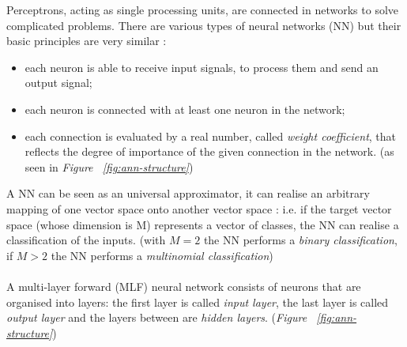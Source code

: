 \documentclass[../main.tex]{subfiles}
\begin{document}
Perceptrons, acting as single processing units, are connected in networks to solve complicated problems. There are various types of neural networks (NN) but their basic principles are very similar \cite{Svozil1997}: 
\begin{itemize}
	\item each neuron is able to receive input signals, to process them and send an output signal;
	\item each neuron is connected with at least one neuron in the network; 
	\item each connection is evaluated by a real number, called \textit{weight coefficient}, that reflects the degree of importance of the given connection in the network. (as seen in \textit{Figure ~\ref{fig:ann-structure}})
\end{itemize}
A NN can be seen as an universal approximator, it can realise an arbitrary mapping of one vector space onto another vector space \cite{Svozil1997}: i.e. if the target vector space (whose dimension is M) represents a vector of classes, the NN can realise a classification of the inputs. (with $M=2$ the NN performs a \textit{binary classification}, if $M>2$ the NN performs a \textit{multinomial classification})  \\ \\
A multi-layer forward (MLF) neural network consists of neurons that are organised into layers: the first layer is called \textit{input layer}, the last layer is called \textit{output layer} and the layers between are \textit{hidden layers}. \cite{Svozil1997} (\textit{Figure ~\ref{fig:ann-structure}}) 

\vspace{5mm}
\end{document}
